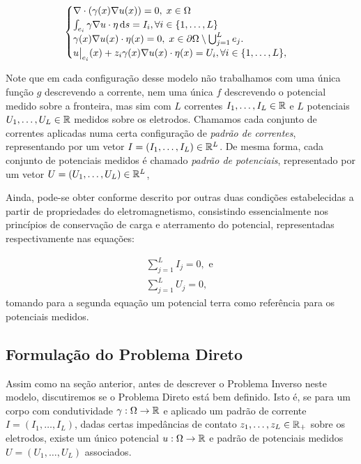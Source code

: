  
\begin{equation}\label{eq:cem}
\begin{cases}
\nabla \cdot (\gamma(x) \nabla u(x)) = 0, \; x\in \Omega \\
\int_{e_i} \gamma \nabla u \cdot \eta \mathop{}\!\mathrm{d} s = I_i, \forall i \in \{1,\dots,L\} \\
\gamma(x) \nabla u(x) \cdot \eta(x) = 0, \; x \in \partial \Omega \setminus \bigcup_{j=1}^L e_j. \\
u\big |_{e_i} (x) + z_i \gamma(x) \nabla u(x) \cdot \eta(x) = U_i, \forall i \in \{1,\dots, L\},
\end{cases}
\end{equation}

Note que em cada configuração desse modelo não trabalhamos com uma única função $g$ descrevendo a corrente, nem uma única $f$ descrevendo o potencial medido sobre a fronteira, mas sim com $L$ correntes $I_1,\dots,I_L \in \mathbb{R}$ e $L$ potenciais $U_1,\dots, U_L \in \mathbb{R}$ medidos sobre os eletrodos. Chamamos cada conjunto de correntes aplicadas numa certa configuração de \textit{padrão de correntes}, representando por um vetor $I=(I_1,\dots,I_L) \in \mathbb{R}^L$. De mesma forma, cada conjunto de potenciais medidos é chamado \textit{padrão de potenciais}, representado por um vetor $U=(U_1,\dots,U_L) \in \mathbb{R}^L$, 

Ainda, pode-se obter conforme descrito por  outras duas condições estabelecidas a partir de propriedades do eletromagnetismo, consistindo essencialmente nos princípios de conservação de carga e aterramento do potencial, representadas respectivamente nas equações:

\begin{align}
    \sum_{j=1}^{L} I_j = 0, \text{ e } \label{eq:conservacao-carga} \\
    \sum_{j=1}^{L} U_j = 0 \label{eq:aterramento-potencial},
\end{align}
tomando para a segunda equação um  potencial terra como referência para 
os potenciais medidos. 

\subsection{Formulação do Problema Direto}

Assim como na seção anterior, antes de descrever o Problema Inverso neste modelo, discutiremos se o Problema Direto está bem definido. Isto é, se para um corpo com condutividade $\gamma : \Omega \to \mathbb{R}$ e aplicado um padrão de corrente $I = (I_1,\dots, I_L)$, dadas certas impedâncias de contato $z_1,\dots,z_L \in \mathbb{R}_+$ sobre os eletrodos, existe um único potencial $u: \Omega \to \mathbb{R}$ e padrão de potenciais medidos $U=(U_1,\dots,U_L)$ associados.

